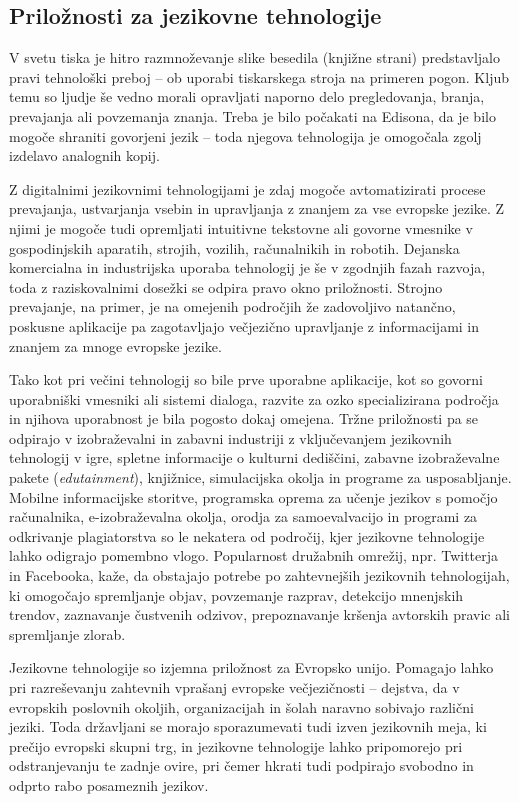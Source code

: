 \begin{multicols}{2}
\subsection{Priložnosti za jezikovne tehnologije}

V svetu tiska  je hitro razmnoževanje slike besedila (knjižne strani) predstav\-ljalo pravi tehnološki preboj – ob uporabi tiskarskega stroja na primeren pogon. Kljub temu so ljudje še vedno morali oprav\-ljati naporno delo pregledovanja, branja, prevajanja ali povzemanja znanja. Treba je bilo počakati na Edisona, da je bilo mogoče shraniti go\-vorjeni jezik – toda njegova tehnologija je omogočala zgolj izdelavo analognih kopij.

Z digitalnimi jezikovnimi tehnologijami je zdaj mogoče avtomatizirati procese prevajanja, ustvarjanja vsebin in uprav\-ljanja z znanjem za vse evropske jezike. Z njimi je mogoče tudi oprem\-ljati intuitivne tekstovne ali go\-vorne vmesnike v gospodinjskih aparatih, stro\-jih, vozilih, računalnikih in robotih. Dejanska komercialna in industrijska uporaba tehnologij je še v zgodnjih fazah razvoja, toda z raziskovalnimi dosežki se odpira pravo okno priložnosti. Stroj\-no prevajanje, na primer, je na omejenih področjih že zadovoljivo natančno, poskusne aplikacije pa zagotav\-ljajo večjezično uprav\-ljanje z informacijami in znanjem za mnoge evropske jezike. 

Tako kot pri večini tehnologij so bile prve uporabne aplikacije, kot so go\-vorni uporabniški vmesniki ali sistemi dialoga, razvite za ozko specializirana področja in njihova uporabnost je bila pogosto dokaj omejena. Tržne priložnosti pa se odpirajo v izobraževalni in zabavni industriji z vključevanjem jezikovnih tehnologij v igre, spletne informacije o kulturni dediščini, zabavne izobraževalne pakete (\textit{edutainment}), knjižnice, simulacij\-ska okolja in programe za usposab\-ljanje. Mobilne informacij\-ske storitve, programska oprema za učenje jezikov s pomočjo računalnika, e-izobraževalna okolja, orodja za samoevalvacijo in programi za odkrivanje plagiatorstva so le nekatera od področij, kjer jezikovne tehnologije lahko odigrajo pomembno vlogo. Popularnost družabnih omrežij, npr. Twitterja in Facebooka, kaže, da obstajajo potrebe po zah\-tevnej\-ših jezikovnih tehnologijah, ki omogočajo sprem\-ljanje objav, povzemanje razprav, detekcijo mnenj\-skih trendov, zaznavanje čustvenih odzivov, prepoznavanje kršenja avtorskih pravic ali spremljanje zlorab. 

Jezikovne tehnologije so izjemna priložnost za Evropsko unijo. Pomagajo lahko pri razreševanju zah\-tevnih vprašanj evropske večjezičnosti – dejstva, da v evropskih poslovnih okoljih, organizacijah in šolah naravno sobivajo različni jeziki. Toda držav\-ljani se morajo sporazumevati tudi izven jezikovnih meja, ki prečijo evropski skupni trg, in jezikovne tehnologije lahko pripomorejo pri odstranjevanju te zadnje ovire, pri čemer hkrati tudi podpirajo svobodno in odprto rabo posameznih jezikov. 


\end{multicols}
